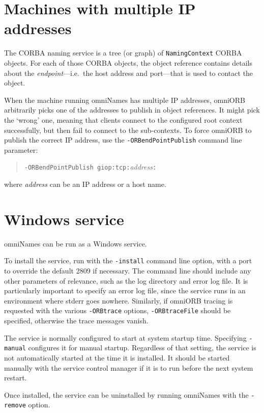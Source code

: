 \documentclass[draft,a4paper,11pt,twoside]{article}
\newcommand{\cmdline}[1]{\texttt{#1}}
\newcommand{\code}[1]{\texttt{#1}}
\begin{document}
\section{Machines with multiple IP addresses}

The CORBA naming service is a tree (or graph) of \code{NamingContext}
CORBA objects. For each of those CORBA objects, the object reference
contains details about the \emph{endpoint}---i.e.\ the host address
and port---that is used to contact the object.

When the machine running omniNames has multiple IP addresses, omniORB
arbitrarily picks one of the addresses to publish in object
references. It might pick the `wrong' one, meaning that clients
connect to the configured root context successfully, but then fail to
connect to the sub-contexts. To force omniORB to publish the correct
IP address, use the \cmdline{-ORBendPointPublish} command line
parameter:

\begin{quote}
\cmdline{-ORBendPointPublish giop:tcp:}\textit{address}\cmdline{:}
\end{quote}

\noindent where \textit{address} can be an IP address or a host name.

\section{Windows service}

omniNames can be run as a Windows service.

To install the service, run with the \cmdline{-install} command line
option, with a port to override the default 2809 if necessary. The
command line should include any other parameters of relevance, such as
the log directory and error log file. It is particularly important to
specify an error log file, since the service runs in an environment
where stderr goes nowhere. Similarly, if omniORB tracing is requested
with the various \cmdline{-ORBtrace} options, \cmdline{-ORBtraceFile}
should be specified, otherwise the trace messages vanish.

The service is normally configured to start at system startup time.
Specifying \cmdline{-manual} configures it for manual startup.
Regardless of that setting, the service is not automatically started
at the time it is installed. It should be started manually with the
service control manager if it is to run before the next system
restart.

Once installed, the service can be uninstalled by running omniNames
with the \cmdline{-remove} option.
\end{document}
